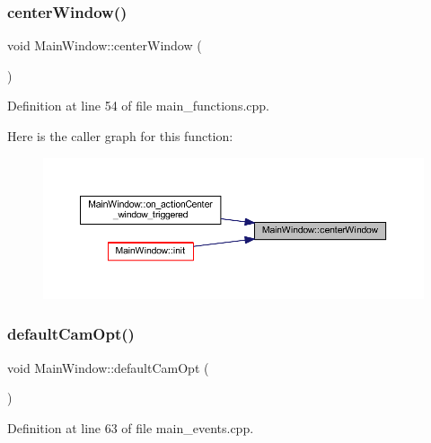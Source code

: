 \subsubsection{\texorpdfstring{centerWindow()}{centerWindow()}}
{\footnotesize\ttfamily void Main\+Window\+::center\+Window (\begin{DoxyParamCaption}{ }\end{DoxyParamCaption})\hspace{0.3cm}{\ttfamily [private]}}



Definition at line 54 of file main\+\_\+functions.\+cpp.

Here is the caller graph for this function\+:
\nopagebreak
\begin{figure}[H]
\begin{center}
\leavevmode
\includegraphics[width=350pt]{class_main_window_a775d79cb8170d36faf4aa9ce4570d8b3_icgraph}
\end{center}
\end{figure}
\mbox{\label{class_main_window_ad6c3df0bfe7f2357d3f2083e20e3810a}} 
\subsubsection{\texorpdfstring{defaultCamOpt()}{defaultCamOpt()}}
{\footnotesize\ttfamily void Main\+Window\+::default\+Cam\+Opt (\begin{DoxyParamCaption}{ }\end{DoxyParamCaption})\hspace{0.3cm}{\ttfamily [private]}}



Definition at line 63 of file main\+\_\+events.\+cpp.

